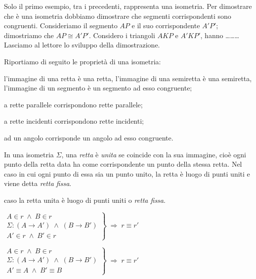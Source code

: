 Solo il primo esempio, tra i precedenti, rappresenta una isometria. 
Per dimostrare che è una isometria dobbiamo dimostrare che segmenti 
corrispondenti sono congruenti. Consideriamo il segmento \(AP\) e il 
suo corrispondente \(A'P'\); dimostriamo che \(AP\cong A'P'\). Considero 
i triangoli \(AKP\) e \(A'KP'\), hanno \ldots\ldots\ldots{}
Lasciamo al lettore lo sviluppo della dimostrazione.

Riportiamo di seguito le proprietà di una isometria:
\begin{itemize*}
\item l'immagine di una retta è una retta, l'immagine di una 
semiretta è una semiretta, l'immagine di un segmento è un segmento ad 
esso congruente;
\item a rette parallele corrispondono rette parallele;
\item a rette incidenti corrispondono rette incidenti;
\item ad un angolo corrisponde un angolo ad esso congruente.
\end{itemize*}

\begin{definizione}
In una isometria \(\Sigma\), una \emph{retta} è \emph{unita} se 
coincide con la sua immagine, cioè ogni punto della retta data ha 
come corrispondente un punto della stessa retta.
Nel caso in cui ogni punto di essa sia un punto unito, la retta è 
luogo di punti uniti e viene detta \emph{retta fissa}.
\end{definizione}

caso la retta unita è luogo di punti uniti o \emph{retta fissa}.

\noindent\begin{minipage}{0.6\textwidth}\parindent15pt
\noindent \(\left.\begin{array}{lll} A\in r \;\wedge\; B\in r\\ \Sigma 
: (A\rightarrow A') \;\wedge\; (B\rightarrow B')\\ A'\in r \;\wedge\; 
B'\in r \end{array}\right\} \;\Rightarrow\; r\equiv r'\)
\end{minipage}\hfil
\begin{minipage}{0.4\textwidth}
  \centering
\end{minipage}\vspace{8pt}

\noindent\begin{minipage}{0.6\textwidth}\parindent15pt
\noindent \(\left.\begin{array}{lll} A\in r \;\wedge\; B\in r\\ \Sigma 
: (A\rightarrow A') \;\wedge\; (B\rightarrow B')\\ A'\equiv A 
\;\wedge\; B'\equiv B \end{array}\right\} \;\Rightarrow\; r\equiv r'\)
\end{minipage}\hfil
\begin{minipage}{0.4\textwidth}
  \centering
\end{minipage}


